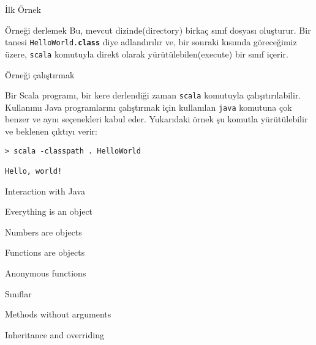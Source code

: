 \documentclass[10pt,a4paper]{book}
\begin{document}
\begin{chapter}{İlk Örnek}
\begin{section}{Örneği derlemek}
Bu, mevcut dizinde(directory) birkaç sınıf dosyası oluşturur. Bir tanesi \texttt{HelloWorld.\textbf{class}} diye adlandırılır ve, bir sonraki kısımda göreceğimiz üzere, \texttt{scala} komutuyla direkt olarak yürütülebilen(execute) bir sınıf içerir.

\end{section}

\begin{section}{Örneği çalıştırmak}

Bir Scala programı, bir kere derlendiği zaman \texttt{scala} komutuyla çalışıtırılabilir. Kullanımı Java programlarını çalıştırmak için kullanılan \texttt{java} komutuna çok benzer ve aynı seçenekleri kabul eder. Yukarıdaki örnek şu komutla yürütülebilir ve beklenen çıktıyı verir:

\begin{verbatim}
> scala -classpath . HelloWorld

Hello, world!
\end{verbatim}

\end{section}

\end{chapter}

\begin{chapter}{Interaction with Java}

\end{chapter}

\begin{chapter}{Everything is an object}

\begin{section}{Numbers are objects}

\end{section}

\begin{section}{Functions are objects}

\begin{subsection}{Anonymous functions}

\end{subsection}

\end{section}

\end{chapter}

\begin{chapter}{Sınıflar}

\begin{section}{Methods without arguments}

\end{section}

\begin{section}{Inheritance and overriding}

\end{section}

\end{chapter}
\end{document}
